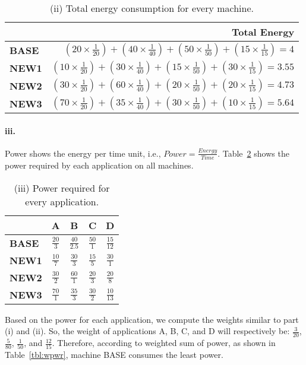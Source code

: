 \documentclass[12pt]{article}
\renewcommand{\part}[1]{\paragraph*{{#1}.}}
\begin{document}
\begin{table}[h]
\center
\begin{tabular}{|l|r|}
	\hline
	 & \textbf{Total Energy} \\
	\hline
	\textbf{BASE} & $(20 \times \frac{1}{20}) + (40 \times \frac{1}{40}) + 
	(50 \times \frac{1}{50}) + (15 \times \frac{1}{15}) = 4$  \\
	\hline
	\textbf{NEW1} & $(10 \times \frac{1}{20}) + (30 \times \frac{1}{40}) + 
	(15 \times \frac{1}{50}) + (30 \times \frac{1}{15}) = 3.55$ \\
	\hline
	\textbf{NEW2} & $(30 \times \frac{1}{20}) + (60 \times \frac{1}{40}) + 
	(20 \times \frac{1}{50}) + (20 \times \frac{1}{15}) = 4.73$ \\
	\hline
	\textbf{NEW3} & $(70 \times \frac{1}{20}) + (35 \times \frac{1}{40}) + 
	(30 \times \frac{1}{50}) + (10 \times \frac{1}{15}) = 5.64$ \\
	\hline
\end{tabular}
\caption{(ii) Total energy consumption for every machine.}
\label{tbl:wenrgy}
\end{table}


\part{iii} Power shows the energy per time unit, i.e., $Power = 
\frac{Energy}{Time}$. Table~\ref{tbl:power} shows the power required by 
each application on all machines.

\begin{table}[h]
\center
\begin{tabular}{|l|c|c|c|c|}
	\hline
	 & \textbf{A} & \textbf{B} & \textbf{C} & \textbf{D} \\
	\hline
	\textbf{BASE} & $\frac{20}{3}$ & $\frac{40}{2.5}$ & $\frac{50}{1}$ 
	& $\frac{15}{12}$ \\
	\hline
	\textbf{NEW1} & $\frac{10}{7}$ & $\frac{30}{3}$ & $\frac{15}{5}$ 
	& $\frac{30}{1}$ \\
	\hline
	\textbf{NEW2} & $\frac{30}{2}$ & $\frac{60}{1}$ & $\frac{20}{3}$ 
	& $\frac{20}{8}$ \\
	\hline
	\textbf{NEW3} & $\frac{70}{1}$ & $\frac{35}{3}$ & $\frac{30}{2}$ 
	& $\frac{10}{13}$ \\
	\hline
\end{tabular}
\caption{(iii) Power required for every application.}
\label{tbl:power}
\end{table}

Based on the power for each application, we compute the weights similar to 
part (i) and (ii). So, the weight of applications A, B, C, and D will respectively 
be: $\frac{3}{20}$, $\frac{5}{80}$, $\frac{1}{50}$, and $\frac{12}{15}$. 
Therefore, according to weighted sum of power, as shown in 
Table~\ref{tbl:wpwr}, machine BASE consumes the least power.
\end{document}
